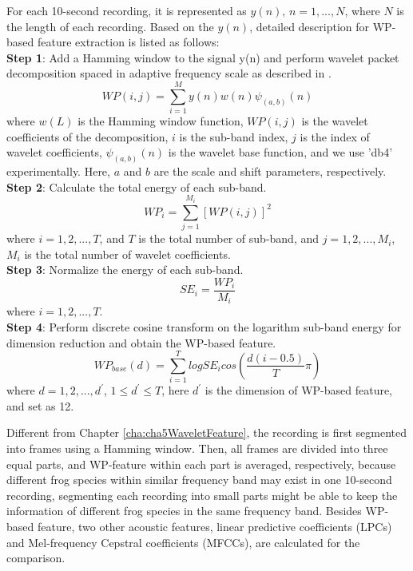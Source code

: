 For each 10-second recording, it is represented as 
$y(n),\,n = 1,...,N$, where $N$ is the length of each recording. Based on the $y(n)$, detailed description for WP-based feature extraction is listed as follows:\\
\textbf{Step 1}: Add a Hamming window to the signal y(n) and perform wavelet packet decomposition spaced in adaptive frequency scale as described in \citep{Xie2016}.
\begin{equation}
WP(i,j)=\sum_{i=1}^{M}y(n)w(n)\psi_{(a,b)}(n) 
\end{equation}
\noindent where $w(L)$ is the Hamming window function, $WP(i,j)$ is the wavelet coefficients of the decomposition, $i$ is the sub-band index, $j$ is the index of wavelet coefficients, $\psi_{(a,b)}(n)$ is the wavelet base function, and we use 'db4' experimentally. Here, $a$ and $b$ are the scale and shift parameters, respectively.
\\
\textbf{Step 2}: Calculate the total energy of each sub-band.
\begin{equation}
WP_{i}=\sum_{j=1}^{M_{i}}[WP(i,j)]^2
\end{equation}
\noindent where $i=1,2,...,T$, and $T$ is the total number of sub-band, and $j=1,2,...,M_{i}$, $M_{i}$ is the total number of wavelet coefficients.
\\
\textbf{Step 3}: Normalize the energy of each sub-band.
\begin{equation}
SE_{i}=\frac{WP_{i}}{M_{i}}
\end{equation}
\noindent where $i=1,2,...,T$.
\\
\textbf{Step 4}: Perform discrete cosine transform on the logarithm sub-band energy for dimension reduction and obtain the WP-based feature.
\begin{equation}
WP_{base}(d)=\sum_{i=1}^{T}logSE_{i}cos(\frac{d(i-0.5)}{T}\pi)
\end{equation}
\noindent where $d=1,2,...,d^{'}$, $1 \leq d^{'} \leq T$, here $d^{'}$ is the dimension of  WP-based feature, and set as 12. 

Different from Chapter \ref{cha:cha5WaveletFeature}, the recording is first segmented into frames using a Hamming window. Then, all frames are divided into three equal parts, and WP-feature within each part is averaged, respectively, because different frog species within similar frequency band may exist in one 10-second recording, segmenting each recording into small parts might be able to keep the information of different frog species in the same frequency band. Besides WP-based feature, two other acoustic features, linear predictive coefficients (LPCs) and Mel-frequency Cepstral coefficients (MFCCs), are calculated for the comparison.




